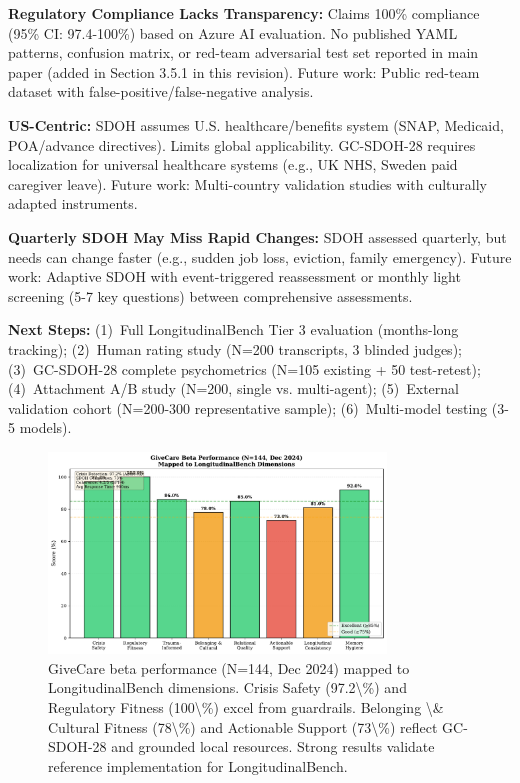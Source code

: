 \documentclass{article}%
\begin{document}
\textbf{Regulatory Compliance Lacks Transparency:} Claims 100\% compliance (95\% CI: 97.4-100\%) based on Azure AI evaluation. No published YAML patterns, confusion matrix, or red-team adversarial test set reported in main paper (added in Section 3.5.1 in this revision). Future work: Public red-team dataset with false-positive/false-negative analysis.

\textbf{US-Centric:} SDOH assumes U.S. healthcare/benefits system (SNAP, Medicaid, POA/advance directives). Limits global applicability. GC-SDOH-28 requires localization for universal healthcare systems (e.g., UK NHS, Sweden paid caregiver leave). Future work: Multi-country validation studies with culturally adapted instruments.

\textbf{Quarterly SDOH May Miss Rapid Changes:} SDOH assessed quarterly, but needs can change faster (e.g., sudden job loss, eviction, family emergency). Future work: Adaptive SDOH with event-triggered reassessment or monthly light screening (5-7 key questions) between comprehensive assessments.

\textbf{Next Steps:} (1)~Full LongitudinalBench Tier 3 evaluation (months-long tracking); (2)~Human rating study (N=200 transcripts, 3 blinded judges); (3)~GC-SDOH-28 complete psychometrics (N=105 existing + 50 test-retest); (4)~Attachment A/B study (N=200, single vs. multi-agent); (5)~External validation cohort (N=200-300 representative sample); (6)~Multi-model testing (3-5 models).

%
\begin{figure}[htbp]%
\centering%
\includegraphics[width=0.8\textwidth]{fig9_beta_results.pdf}%
\caption{GiveCare beta performance (N=144, Dec 2024) mapped to LongitudinalBench dimensions. Crisis Safety (97.2\textbackslash{}\%) and Regulatory Fitness (100\textbackslash{}\%) excel from guardrails. Belonging \textbackslash{}\& Cultural Fitness (78\textbackslash{}\%) and Actionable Support (73\textbackslash{}\%) reflect GC{-}SDOH{-}28 and grounded local resources. Strong results validate reference implementation for LongitudinalBench.}%
\label{fig:beta}%
\end{figure}%
\end{document}
